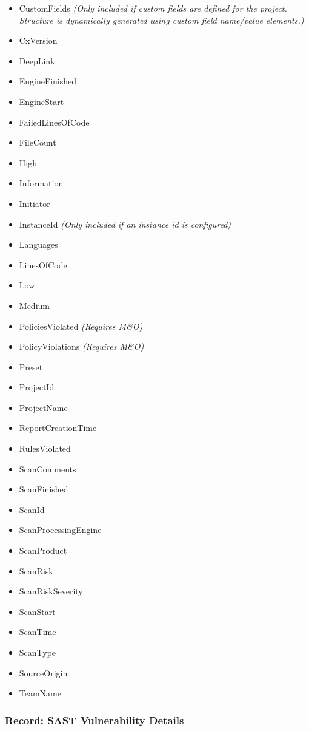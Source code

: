 \begin{itemize}
    \item CustomFields \textit{(Only included if custom fields are defined for the project.  Structure is dynamically generated using custom field name/value elements.)}
    \item CxVersion
    \item DeepLink
    \item EngineFinished
    \item EngineStart
    \item FailedLinesOfCode
    \item FileCount
    \item High
    \item Information
    \item Initiator
    \item InstanceId \textit{(Only included if an instance id is configured)}
    \item Languages
    \item LinesOfCode
    \item Low
    \item Medium
    \item PoliciesViolated \textit{(Requires M\&O)}
    \item PolicyViolations \textit{(Requires M\&O)}
    \item Preset
    \item ProjectId
    \item ProjectName
    \item ReportCreationTime
    \item RulesViolated
    \item ScanComments
    \item ScanFinished
    \item ScanId
    \item ScanProcessingEngine
    \item ScanProduct
    \item ScanRisk
    \item ScanRiskSeverity
    \item ScanStart
    \item ScanTime
    \item ScanType
    \item SourceOrigin
    \item TeamName
\end{itemize}


\subsubsection{Record: SAST Vulnerability Details}

